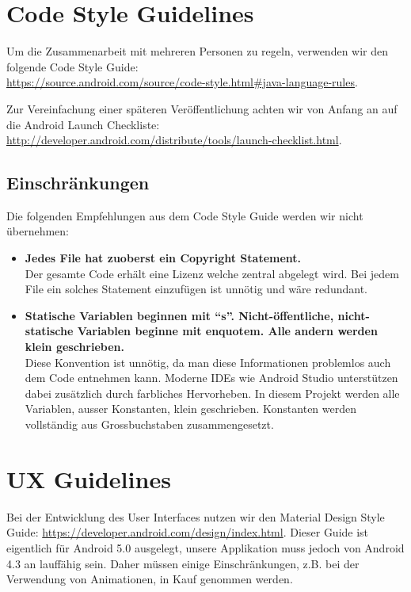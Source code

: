\section{Code Style Guidelines}
\label{sec:Code Style Guidelines}

Um die Zusammenarbeit mit mehreren Personen zu regeln, verwenden wir den folgende Code Style Guide:\\ \url{https://source.android.com/source/code-style.html#java-language-rules}.

Zur Vereinfachung einer späteren Veröffentlichung achten wir von Anfang an auf die Android Launch Checkliste:\\ \url{http://developer.android.com/distribute/tools/launch-checklist.html}.

\subsection{Einschränkungen}
Die folgenden Empfehlungen aus dem Code Style Guide werden wir nicht übernehmen:

\begin{itemize}
\item \textbf{Jedes File hat zuoberst ein Copyright Statement.} \\ Der gesamte Code erhält eine Lizenz welche zentral abgelegt wird. Bei jedem File ein solches Statement einzufügen ist unnötig und wäre redundant.
\item \textbf{Statische Variablen beginnen mit \enquote{s}. Nicht-öffentliche, nicht-statische Variablen beginne mit enquote{m}. Alle andern werden klein geschrieben.} \\ Diese Konvention ist unnötig, da man diese Informationen problemlos auch dem Code entnehmen kann. Moderne IDEs wie Android Studio unterstützen dabei zusätzlich durch farbliches Hervorheben. In diesem Projekt werden alle Variablen, ausser Konstanten, klein geschrieben. Konstanten werden vollständig aus Grossbuchstaben zusammengesetzt.
\end{itemize}

\section{UX Guidelines}
\label{sec:UX Guidelines}

Bei der Entwicklung des User Interfaces nutzen wir den Material Design Style Guide:
\url{https://developer.android.com/design/index.html}. Dieser Guide ist eigentlich für Android 5.0 ausgelegt, unsere Applikation muss jedoch von Android 4.3 an lauffähig sein. Daher müssen einige Einschränkungen, z.B. bei der Verwendung von Animationen, in Kauf genommen werden.
